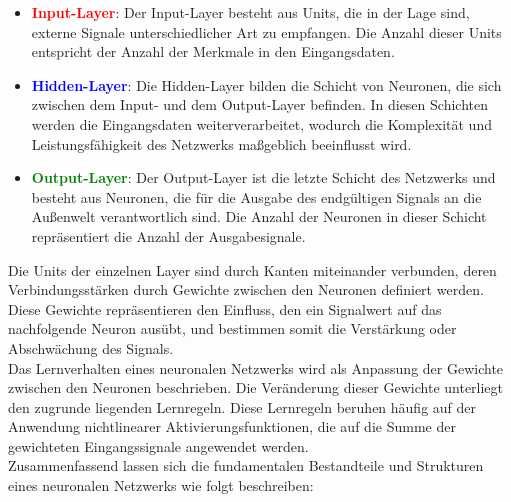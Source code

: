 \documentclass[a4paper, 12pt]{article}
\begin{document}
\begin{itemize}
    \item \textcolor{red}{\textbf{Input-Layer}}: 
    Der Input-Layer besteht aus Units, die in der Lage sind, externe Signale unterschiedlicher Art 
	zu empfangen. Die Anzahl dieser Units entspricht der Anzahl der Merkmale in den Eingangsdaten.
    
    \item \textcolor{blue}{\textbf{Hidden-Layer}}: 
    Die Hidden-Layer bilden die Schicht von Neuronen, die sich zwischen dem Input- und dem 
	Output-Layer befinden. In diesen Schichten werden die Eingangsdaten weiterverarbeitet, wodurch 
	die Komplexität und Leistungsfähigkeit des Netzwerks maßgeblich beeinflusst wird.
    
    \item \textcolor{green}{\textbf{Output-Layer}}: 
    Der Output-Layer ist die letzte Schicht des Netzwerks und besteht aus Neuronen, die für die 
	Ausgabe des endgültigen Signals an die Außenwelt verantwortlich sind. Die Anzahl der Neuronen 
	in dieser Schicht repräsentiert die Anzahl der Ausgabesignale.
\end{itemize}

Die Units der einzelnen Layer sind durch Kanten miteinander verbunden, deren Verbindungsstärken durch 
Gewichte zwischen den Neuronen definiert werden. Diese Gewichte repräsentieren den Einfluss, den ein 
Signalwert auf das nachfolgende Neuron ausübt, und bestimmen somit die Verstärkung oder Abschwächung 
des Signals.\\
Das Lernverhalten eines neuronalen Netzwerks wird als Anpassung der Gewichte zwischen den Neuronen 
beschrieben.\cite{rey2019neuronale} Die Veränderung dieser Gewichte unterliegt den zugrunde liegenden 
Lernregeln. Diese Lernregeln beruhen häufig auf der Anwendung nichtlinearer Aktivierungsfunktionen, 
die auf die Summe der gewichteten Eingangssignale angewendet werden.\\
Zusammenfassend lassen sich die fundamentalen Bestandteile und Strukturen eines neuronalen Netzwerks 
wie folgt beschreiben:
\end{document}
